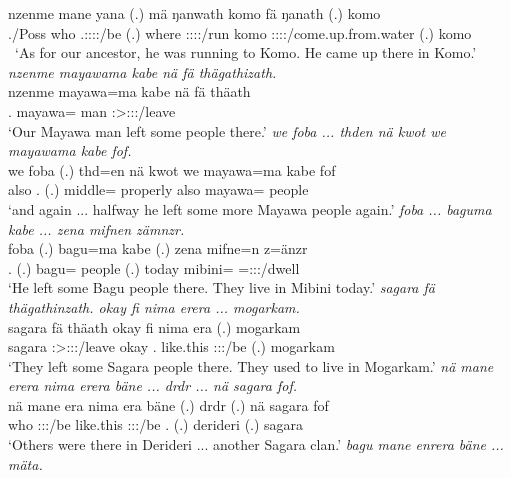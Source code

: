\begin{exe}
	\gll nzenme mane yana (.) mä ŋanwath komo fä ŋanath (.) komo\\ 
	\Fnsg./Poss{} who \Tsg.\Masc:\Sbj:\Pst:\Ipfv:\Venit/be (.) where \Stpl:\Sbj:\Pst:\Ipfv:\Venit/run komo {\Dist} \Stpl:\Sbj:\Pst:\Ipfv:\Venit/come.up.from.water (.) komo\\\
	\trans `As for our ancestor, he was running to Komo. He came up there in Komo.'
\exi{85} 
	\emph{nzenme mayawama kabe nä fä thägathizath.}\\
	\gll nzenme mayawa=ma kabe nä fä thäath\\ 
	\Fnsg.{\Poss} mayawa={\Char} man {\Indf} {\Dist} \Stpl:\Sbj>\Stpl:\Obj:\Pst:\Pfv/leave\\
	\trans `Our Mayawa man left some people there.'
	\emph{we foba ... thden nä kwot we mayawama kabe fof.}\\
	\gll we foba (.) thd=en nä kwot we mayawa=ma kabe fof\\ 
	also \Dist.{\Abl} (.) middle={\Loc} {\Indf} properly also mayawa={\Char} people \Emph\\
	\trans `and again ... halfway he left some more Mayawa people again.'
\exi{87} 
	\emph{foba ... baguma kabe ... zena mifnen zämnzr.}\\
	\gll foba (.) bagu=ma kabe (.) zena mifne=n z=änzr\\ 
	\Dist.{\Abl} (.) bagu={\Char} people (.) today mibini={\Loc} \Prox=\Stpl:\Sbj:\Nonpast:\Ipfv/dwell\\
	\trans `He left some Bagu people there. They live in Mibini today.'
\exi{88} 
	\emph{sagara fä thägathinzath. okay fi nima erera ... mogarkam.}\\
	\gll sagara fä thä\stem{gathinz}ath okay fi nima e\stem{rä}ra (.) mogarkam\\ 
	sagara {\Dist} \Stpl:\Sbj>\Stpl:\Obj:\Pst:\Ipfv/leave okay \Third.{\Abs} like.this \Stpl:\Sbj:\Pst:\Ipfv/be (.) mogarkam\\
	\trans `They left some Sagara people there. They used to live in Mogarkam.'
\exi{89} 
	\emph{nä mane erera nima erera bäne ... drdr ... nä sagara fof.}\\
	\gll nä mane era nima e\stem{rä}ra bäne (.) drdr (.) nä sagara fof\\ 
	{\Indf} who \Stpl:\Sbj:\Pst:\Ipfv/be like.this \Stpl:\Sbj:\Pst:\Ipfv/be \Recog.{\Abs} (.) derideri (.) {\Indf} sagara \Emph\\
	\trans `Others were there in Derideri ... another Sagara clan.'
\exi{90} 
	\emph{bagu mane enrera bäne ... mäta.}\\

\end{exe}
